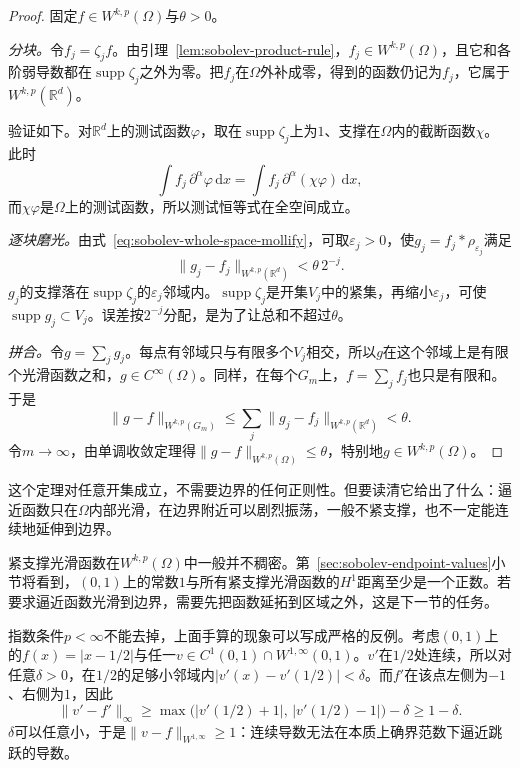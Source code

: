 \begin{proof}
固定$f\in W^{k,p}(\Omega)$与$\theta>0$。

\emph{分块。}令$f_j=\zeta_jf$。由引理~\ref{lem:sobolev-product-rule}，$f_j\in W^{k,p}(\Omega)$，且它和各阶弱导数都在$\operatorname{supp}\zeta_j$之外为零。把$f_j$在$\Omega$外补成零，得到的函数仍记为$f_j$，它属于$W^{k,p}(\mathbb R^d)$。

验证如下。对$\mathbb R^d$上的测试函数$\varphi$，取在$\operatorname{supp}\zeta_j$上为$1$、支撑在$\Omega$内的截断函数$\chi$。此时
\[
\int f_j\,\partial^\alpha\varphi\,\mathrm dx=\int f_j\,\partial^\alpha(\chi\varphi)\,\mathrm dx,
\]
而$\chi\varphi$是$\Omega$上的测试函数，所以测试恒等式在全空间成立。

\emph{逐块磨光。}由式~\eqref{eq:sobolev-whole-space-mollify}，可取$\varepsilon_j>0$，使$g_j=f_j*\rho_{\varepsilon_j}$满足
\[
\lVert g_j-f_j\rVert_{W^{k,p}(\mathbb R^d)}<\theta\,2^{-j}.
\]
$g_j$的支撑落在$\operatorname{supp}\zeta_j$的$\varepsilon_j$邻域内。$\operatorname{supp}\zeta_j$是开集$V_j$中的紧集，再缩小$\varepsilon_j$，可使$\operatorname{supp}g_j\subset V_j$。误差按$2^{-j}$分配，是为了让总和不超过$\theta$。

\emph{拼合。}令$g=\sum_jg_j$。每点有邻域只与有限多个$V_j$相交，所以$g$在这个邻域上是有限个光滑函数之和，$g\in C^\infty(\Omega)$。同样，在每个$G_m$上，$f=\sum_jf_j$也只是有限和。于是
\[
\lVert g-f\rVert_{W^{k,p}(G_m)}\leq\sum_j\lVert g_j-f_j\rVert_{W^{k,p}(\mathbb R^d)}<\theta .
\]
令$m\to\infty$，由单调收敛定理得$\lVert g-f\rVert_{W^{k,p}(\Omega)}\leq\theta$，特别地$g\in W^{k,p}(\Omega)$。
\end{proof}

这个定理对任意开集成立，不需要边界的任何正则性。但要读清它给出了什么：逼近函数只在$\Omega$内部光滑，在边界附近可以剧烈振荡，一般不紧支撑，也不一定能连续地延伸到边界。

紧支撑光滑函数在$W^{k,p}(\Omega)$中一般并不稠密。第~\ref{sec:sobolev-endpoint-values}小节将看到，$(0,1)$上的常数$1$与所有紧支撑光滑函数的$H^1$距离至少是一个正数。若要求逼近函数光滑到边界，需要先把函数延拓到区域之外，这是下一节的任务。

指数条件$p<\infty$不能去掉，上面手算的现象可以写成严格的反例。考虑$(0,1)$上的$f(x)=|x-1/2|$与任一$v\in C^1(0,1)\cap W^{1,\infty}(0,1)$。$v'$在$1/2$处连续，所以对任意$\delta>0$，在$1/2$的足够小邻域内$|v'(x)-v'(1/2)|<\delta$。而$f'$在该点左侧为$-1$、右侧为$1$，因此
\[
\lVert v'-f'\rVert_\infty
\geq\max\bigl(|v'(1/2)+1|,\,|v'(1/2)-1|\bigr)-\delta
\geq1-\delta .
\]
$\delta$可以任意小，于是$\lVert v-f\rVert_{W^{1,\infty}}\geq1$：连续导数无法在本质上确界范数下逼近跳跃的导数。
